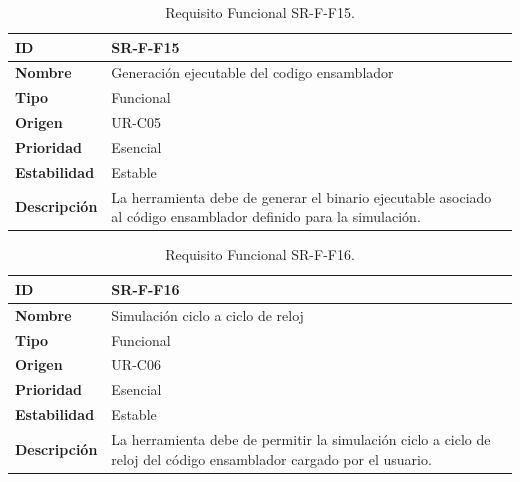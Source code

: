 \begin{center}
\begin{table}[htbp]
\centering
\begin{tabular}{@{}p{2.5cm} p{9cm}@{}} 
\toprule
\textbf{ID} 				& SR-F-F15 \\
\midrule
\textbf{Nombre} 			& Generación ejecutable del codigo ensamblador\\
\midrule
\textbf{Tipo} 			& Funcional \\
\midrule
\textbf{Origen} 			& UR-C05 \\
\midrule
\textbf{Prioridad}		& Esencial \\
\midrule
\textbf{Estabilidad} 		& Estable \\
\midrule
\textbf{Descripción} 	& La herramienta debe de generar el binario ejecutable asociado al código ensamblador definido para la simulación. \\
\bottomrule
\end{tabular}
\caption{Requisito Funcional SR-F-F15.}
\label{tab:srff15}
\end{table}
\end{center}

\begin{center}
\begin{table}[htbp]
\centering
\begin{tabular}{@{}p{2.5cm} p{9cm}@{}} 
\toprule
\textbf{ID} 				& SR-F-F16 \\
\midrule
\textbf{Nombre} 			& Simulación ciclo a ciclo de reloj\\
\midrule
\textbf{Tipo} 			& Funcional \\
\midrule
\textbf{Origen} 			& UR-C06 \\
\midrule
\textbf{Prioridad}		& Esencial \\
\midrule
\textbf{Estabilidad} 		& Estable \\
\midrule
\textbf{Descripción} 	& La herramienta debe de permitir la simulación ciclo a ciclo de reloj del código ensamblador cargado por el usuario. \\
\bottomrule
\end{tabular}
\caption{Requisito Funcional SR-F-F16.}
\label{tab:srff16}
\end{table}
\end{center}

